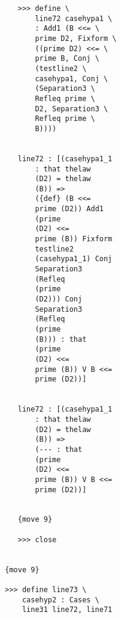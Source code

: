 \documentclass[12pt]{article}
\begin{document}
\begin{verbatim}
                              >>> define \
                                  line72 casehypa1 \
                                  : Add1 (B <<= \
                                  prime D2, Fixform \
                                  ((prime D2) <<= \
                                  prime B, Conj \
                                  (testline2 \
                                  casehypa1, Conj \
                                  (Separation3 \
                                  Refleq prime \
                                  D2, Separation3 \
                                  Refleq prime \
                                  B))))


                              line72 : [(casehypa1_1 
                                  : that thelaw 
                                  (D2) = thelaw 
                                  (B)) => 
                                  ({def} (B <<= 
                                  prime (D2)) Add1 
                                  (prime 
                                  (D2) <<= 
                                  prime (B)) Fixform 
                                  testline2 
                                  (casehypa1_1) Conj 
                                  Separation3 
                                  (Refleq 
                                  (prime 
                                  (D2))) Conj 
                                  Separation3 
                                  (Refleq 
                                  (prime 
                                  (B))) : that 
                                  (prime 
                                  (D2) <<= 
                                  prime (B)) V B <<= 
                                  prime (D2))]


                              line72 : [(casehypa1_1 
                                  : that thelaw 
                                  (D2) = thelaw 
                                  (B)) => 
                                  (--- : that 
                                  (prime 
                                  (D2) <<= 
                                  prime (B)) V B <<= 
                                  prime (D2))]


                              {move 9}

                              >>> close


                           {move 9}

                           >>> define line73 \
                               casehyp2 : Cases \
                               line31 line72, line71



\end{verbatim}
\end{document}
